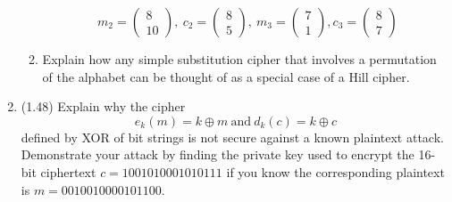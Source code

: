 \documentclass[12pt]{amsart}
\theoremstyle{definition}
\begin{document}
\begin{enumerate}
\begin{enumerate}
\begin{displaymath}
			\ m_2 = \begin{pmatrix} 8 \\ 10 \end{pmatrix}, \ c_2 = \begin{pmatrix} 8 \\ 5 
			\end{pmatrix}, \ m_3 = \begin{pmatrix} 7 \\ 1 \end{pmatrix}, c_3 = 
			\begin{pmatrix} 8 \\ 7 \end{pmatrix} 
		\end{displaymath}
		\item Explain how any simple substitution cipher that involves a permutation of the alphabet 
		can be thought of as a special case of a Hill cipher.
	\end{enumerate}
\item (1.48) Explain why the cipher 
	\begin{displaymath}
		e_k(m) = k \oplus m \ \text{and} \ d_k(c) = k \oplus c 
	\end{displaymath}
	defined by XOR of bit strings is not secure against a known plaintext attack. Demonstrate your attack 
	by finding the private key used to encrypt the 16-bit 
	ciphertext $c = 1001010001010111$ if you know the corresponding plaintext is $m = 0010010000101100$.
\end{enumerate}
\end{document}
